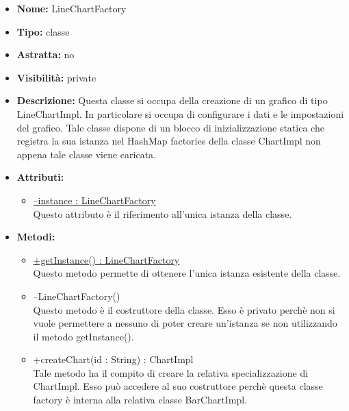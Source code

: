 			
			\begin{itemize}
			\item \textbf{Nome:} LineChartFactory
			\item \textbf{Tipo:} classe
			
		\item \textbf{Astratta:}
		no
			\item \textbf{Visibilità:} private
			\item \textbf{Descrizione:} Questa classe si occupa della creazione di un grafico di tipo LineChartImpl. In particolare si occupa di configurare i dati e le impostazioni del grafico. Tale classe dispone di un blocco di inizializzazione statica che registra la sua istanza nel HashMap factories della classe ChartImpl non appena tale classe viene caricata.
			\item \textbf{Attributi:}
				\begin{itemize}
				\setlength{\itemsep}{5pt}
				
					\item[\ding{111}] \underline{--instance : LineChartFactory} \\ [1mm] Questo attributo è il riferimento all'unica istanza della classe.
				\end{itemize}
		
			\item \textbf{Metodi:}
				\begin{itemize}
				\setlength{\itemsep}{5pt}
				
					\item[\ding{111}] {\underline{+getInstance() : LineChartFactory}} \\ [1mm] Questo metodo permette di ottenere l'unica istanza esistente della classe.
					\item[\ding{111}] {{--LineChartFactory()}} \\ [1mm] Questo metodo è il costruttore della classe. Esso è privato perchè non si vuole permettere a nessuno di poter creare un’istanza se non utilizzando il metodo getInstance().

					\item[\ding{111}] {{+createChart(id : String) : ChartImpl}} \\ [1mm] Tale metodo ha il compito di creare la relativa specializzazione di ChartImpl. Esso può accedere al suo costruttore perchè questa classe factory è interna alla relativa classe BarChartImpl.
				\end{itemize}
		
			\end{itemize}

